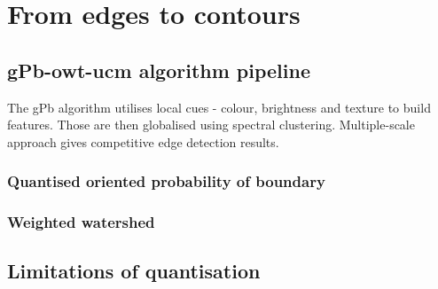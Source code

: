 \chapter{From edges to contours} %
\label{Chapter2}
\section{gPb-owt-ucm algorithm pipeline}
The gPb algorithm utilises local cues - colour, brightness and texture to build features. Those are then globalised using spectral clustering. Multiple-scale approach gives competitive edge detection results.

\subsection{Quantised oriented probability of boundary}
\subsection{Weighted watershed}
\section{Limitations of quantisation} %
